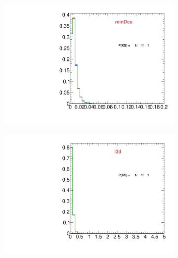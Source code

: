 \begin{figure}
\begin{subfigure}[b]{0.2\textwidth}
                \centering
                \includegraphics[width=\textwidth]{Figures/VariablesComparison/Data_endcaps_figs_3h/minDca}
                \label{fig:Data_endcaps_minDca_3h}
        \end{subfigure}
        \begin{subfigure}[b]{0.2\textwidth}
                \centering
                \includegraphics[width=\textwidth]{Figures/VariablesComparison/Data_endcaps_figs_3h/l3d}
                \label{fig:Data_endcaps_l3d_3h}
        \end{subfigure}
        \begin{subfigure}[b]{0.2\textwidth}
                \centering

\end{subfigure}
\end{figure}
